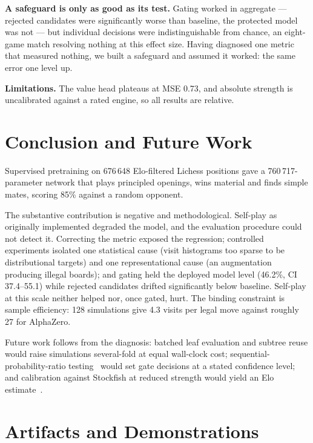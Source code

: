 \documentclass{article}
\begin{document}
\noindent\textbf{A safeguard is only as good as its test.}
Gating worked in aggregate --- rejected candidates were significantly worse
than baseline, the protected model was not --- but individual decisions were
indistinguishable from chance, an eight-game match resolving nothing at this
effect size. Having diagnosed one metric that measured nothing, we built a
safeguard and assumed it worked: the same error one level up.

\noindent\textbf{Limitations.}
The value head plateaus at MSE 0.73, and absolute strength is uncalibrated
against a rated engine, so all results are relative.

\section{Conclusion and Future Work}
\label{sec:conclusion}

Supervised pretraining on 676\,648 Elo-filtered Lichess positions gave a
760\,717-parameter network that plays principled openings, wins material and
finds simple mates, scoring 85\% against a random opponent.

The substantive contribution is negative and methodological. Self-play
as originally implemented degraded the model, and the evaluation procedure
could not detect it. Correcting the metric exposed the regression; controlled
experiments isolated one statistical cause (visit histograms too sparse to be
distributional targets) and one representational cause (an augmentation
producing illegal boards); and gating held the deployed model level (46.2\%,
CI 37.4--55.1) while rejected candidates drifted significantly below
baseline. Self-play at this scale neither helped nor, once gated, hurt. The
binding constraint is sample efficiency: 128 simulations give 4.3 visits per
legal move against roughly 27 for AlphaZero.

Future work follows from the diagnosis: batched leaf evaluation and
subtree reuse would raise simulations several-fold at equal wall-clock cost;
sequential-probability-ratio testing~\cite{wald1945sprt} would set gate
decisions at a stated confidence level; and calibration against Stockfish at
reduced strength would yield an Elo estimate~\cite{elo1978rating}.

\section{Artifacts and Demonstrations}
\end{document}
